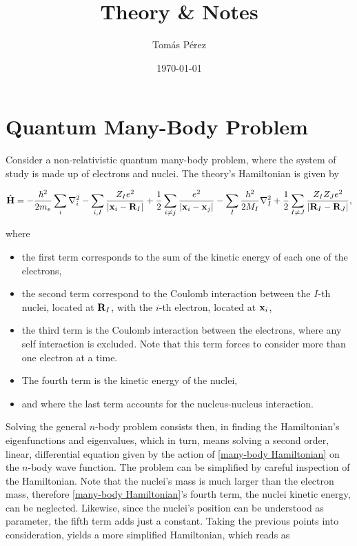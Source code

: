\documentclass{homework}
\author{Tomás Pérez}
\date{\today}
\title{Theory \& Notes}
\begin{document}
 \maketitle

\section{Quantum Many-Body Problem}

Consider a non-relativistic quantum many-body problem, where the system of study is made up of electrons and nuclei. The theory's Hamiltonian is given by

\begin{align}
    \hat{\bf H} = -\frac{\hbar^2}{2m_e} \sum_i \nabla^2_i - \sum_{i, I} \frac{Z_I e^2}{|{\bf x}_i - {\bf R}_I|} + \frac{1}{2} \sum_{i \neq j} \frac{e^2}{|{\bf x}_i-{\bf x}_j|} - \sum_{I} \frac{\hbar^2}{2M_I} \nabla^2_I + \frac{1}{2} \sum_{I \neq J} \frac{Z_I Z_J e^2}{|{\bf R}_I - {\bf R}_J|},
\label{many-body Hamiltonian}
\end{align}

where 

\begin{itemize}
    \item the first term corresponds to the sum of the kinetic energy of each one of the electrons,
    \item the second term correspond to the Coulomb interaction between the $I$-th nuclei, located at ${\bf R}_I$, with the $i$-th electron, located at ${{\bf x}_i}$,
    \item the third term is the Coulomb interaction between the electrons, where any self interaction is excluded. Note that this term forces to consider more than one electron at a time. 
    \item The fourth term is the kinetic energy of the nuclei, 
    \item and where the last term accounts for the nucleus-nucleus interaction. \\
\end{itemize}

Solving the general $n$-body problem consists then, in finding the Hamiltonian's eigenfunctions and eigenvalues, which in turn, means solving a second order, linear, differential equation given by the action of \eqref{many-body Hamiltonian} on the $n$-body wave function. The problem can be simplified by careful inspection of the Hamiltonian. Note that the nuclei's mass is much larger than the electron mass, therefore \eqref{many-body Hamiltonian}'s fourth term, the nuclei kinetic energy, can be neglected. Likewise, since the nuclei's position can be understood as parameter, the fifth term adds just a constant. Taking the previous points into consideration, yields a more simplified Hamiltonian, which reads as
\end{document}
